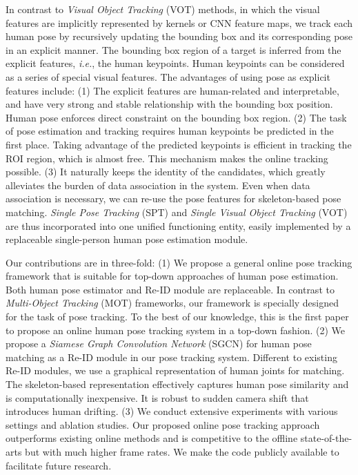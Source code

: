 \documentclass[10pt,twocolumn,letterpaper]{article}
\begin{document}
	
	In contrast to \textit{Visual Object Tracking} (VOT) methods, in which the visual features are implicitly represented by kernels or CNN feature maps, we track each human pose by recursively updating the bounding box and its corresponding pose in an explicit manner. The bounding box region of a target is inferred from the explicit features, \emph{i.e.}, the human keypoints. Human keypoints can be considered as a series of special visual features. 
	The advantages of using pose as explicit features include: (1) The explicit features are human-related and interpretable, and have very strong and stable relationship with the bounding box position. Human pose enforces direct constraint on the bounding box region. (2) The task of pose estimation and tracking requires human keypoints be predicted in the first place. Taking advantage of the predicted keypoints is efficient in tracking the ROI region, which is almost free. This mechanism makes the online tracking possible. (3) It naturally keeps the identity of the candidates, which greatly alleviates the burden of data association in the system. Even when data association is necessary, we can re-use the pose features for skeleton-based pose matching.
	\textit{Single Pose Tracking} (SPT) and \textit{Single Visual Object Tracking} (VOT) are thus incorporated into one unified functioning entity, easily implemented by a replaceable single-person human pose estimation module.
	
	Our contributions are in three-fold: (1) We propose a general online pose tracking framework that is suitable for top-down approaches of human pose estimation. Both human pose estimator and Re-ID module are replaceable. In contrast to \textit{Multi-Object Tracking} (MOT) frameworks, our framework is specially designed for the task of pose tracking. To the best of our knowledge, this is the first paper to propose an online human pose tracking system in a top-down fashion. 
	(2) We propose a \textit{Siamese Graph Convolution Network} (SGCN) for human pose matching as a Re-ID module in our pose tracking system. Different to existing Re-ID modules, we use a graphical representation of human joints for matching. The skeleton-based representation effectively captures human pose similarity and is computationally inexpensive. It is robust to sudden camera shift that introduces human drifting.
	(3) We conduct extensive experiments with various settings and ablation studies. Our proposed online pose tracking approach outperforms existing online methods and is competitive to the offline state-of-the-arts but with much higher frame rates. We make the code publicly available to facilitate future research. 
	
\end{document}
